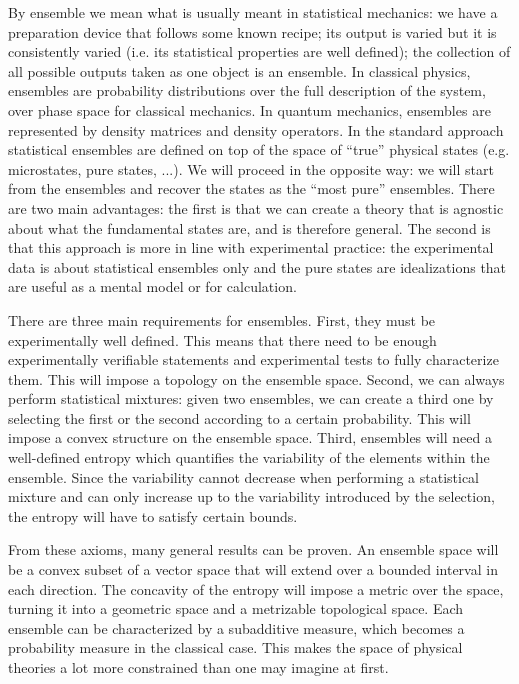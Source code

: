 By ensemble we mean what is usually meant in statistical mechanics: we have a preparation device that follows some known recipe; its output is varied but it is consistently varied (i.e. its statistical properties are well defined); the collection of all possible outputs taken as one object is an ensemble. In classical physics, ensembles are probability distributions over the full description of the system, over phase space for classical mechanics. In quantum mechanics, ensembles are represented by density matrices and density operators. In the standard approach statistical ensembles are defined on top of the space of ``true'' physical states (e.g. microstates, pure states, ...). We will proceed in the opposite way: we will start from the ensembles and recover the states as the ``most pure'' ensembles. There are two main advantages: the first is that we can create a theory that is agnostic about what the fundamental states are, and is therefore general. The second is that this approach is more in line with experimental practice: the experimental data is about statistical ensembles only and the pure states are idealizations that are useful as a mental model or for calculation.

There are three main requirements for ensembles. First, they must be experimentally well defined. This means that there need to be enough experimentally verifiable statements and experimental tests to fully characterize them. This will impose a topology on the ensemble space. Second, we can always perform statistical mixtures: given two ensembles, we can create a third one by selecting the first or the second according to a certain probability. This will impose a convex structure on the ensemble space. Third, ensembles will need a well-defined entropy which quantifies the variability of the elements within the ensemble. Since the variability cannot decrease when performing a statistical mixture and can only increase up to the variability introduced by the selection, the entropy will have to satisfy certain bounds.

From these axioms, many general results can be proven. An ensemble space will be a convex subset of a vector space that will extend over a bounded interval in each direction. The concavity of the entropy will impose a metric over the space, turning it into a geometric space and a metrizable topological space. Each ensemble can be characterized by a subadditive measure, which becomes a probability measure in the classical case. This makes the space of physical theories a lot more constrained than one may imagine at first.

